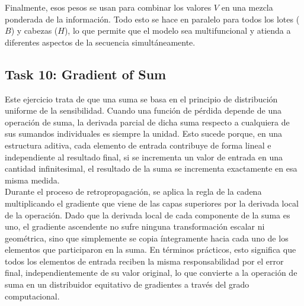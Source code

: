 \documentclass[12pt]{article}
\begin{document}
Finalmente, esos pesos se usan para combinar los valores $V$ en una mezcla ponderada de la información. Todo esto se hace en paralelo para todos los lotes ($B$) y cabezas ($H$), lo que permite que el modelo sea multifuncional y atienda a diferentes aspectos de la secuencia simultáneamente.



\subsection*{Task 10: Gradient of Sum}
Este ejercicio trata de que una suma se basa en el principio de 
distribución uniforme de la sensibilidad. Cuando una
función de pérdida depende de una operación de suma, la derivada parcial de dicha 
suma respecto a cualquiera de sus sumandos individuales es siempre la unidad. 
Esto sucede porque, en una estructura aditiva, cada elemento de entrada
contribuye de forma lineal e independiente al resultado final, si 
se incrementa un valor de entrada en una cantidad infinitesimal, el resultado de la suma
se incrementa exactamente en esa misma medida. \\
Durante el proceso de retropropagación, se aplica la regla de la cadena multiplicando 
el gradiente que viene de las capas superiores por la derivada local de la operación. 
Dado que la derivada local de cada componente de la suma es uno, el gradiente ascendente
no sufre ninguna transformación escalar ni geométrica, sino que simplemente se copia 
íntegramente hacia cada uno de los elementos que participaron en la suma. En términos prácticos, 
esto significa que todos los elementos de entrada reciben la misma responsabilidad por el error
final, independientemente de su valor original, lo que convierte a la operación de suma en un 
distribuidor equitativo de gradientes a través del grado computacional.
\end{document}
